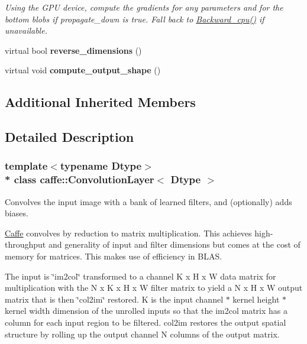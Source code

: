 \begin{DoxyCompactItemize}
\begin{DoxyCompactList}\small\item\em Using the G\+PU device, compute the gradients for any parameters and for the bottom blobs if propagate\+\_\+down is true. Fall back to \hyperlink{classcaffe_1_1ConvolutionLayer_ac1591049f064bd88ccdc785a948ed4b2}{Backward\+\_\+cpu()} if unavailable. \end{DoxyCompactList}\item 
virtual bool {\bfseries reverse\+\_\+dimensions} ()\hypertarget{classcaffe_1_1ConvolutionLayer_aad2f350240e3e97220230d7b4ceb9bf7}{}\label{classcaffe_1_1ConvolutionLayer_aad2f350240e3e97220230d7b4ceb9bf7}

\item 
virtual void {\bfseries compute\+\_\+output\+\_\+shape} ()\hypertarget{classcaffe_1_1ConvolutionLayer_ae6c1466c758151bf24215a06a6517cbe}{}\label{classcaffe_1_1ConvolutionLayer_ae6c1466c758151bf24215a06a6517cbe}

\end{DoxyCompactItemize}
\subsection*{Additional Inherited Members}


\subsection{Detailed Description}
\subsubsection*{template$<$typename Dtype$>$\\*
class caffe\+::\+Convolution\+Layer$<$ Dtype $>$}

Convolves the input image with a bank of learned filters, and (optionally) adds biases. 

\hyperlink{classcaffe_1_1Caffe}{Caffe} convolves by reduction to matrix multiplication. This achieves high-\/throughput and generality of input and filter dimensions but comes at the cost of memory for matrices. This makes use of efficiency in B\+L\+AS.

The input is \char`\"{}im2col\char`\"{} transformed to a channel K\textquotesingle{} x H x W data matrix for multiplication with the N x K\textquotesingle{} x H x W filter matrix to yield a N\textquotesingle{} x H x W output matrix that is then \char`\"{}col2im\char`\"{} restored. K\textquotesingle{} is the input channel $\ast$ kernel height $\ast$ kernel width dimension of the unrolled inputs so that the im2col matrix has a column for each input region to be filtered. col2im restores the output spatial structure by rolling up the output channel N\textquotesingle{} columns of the output matrix. 

